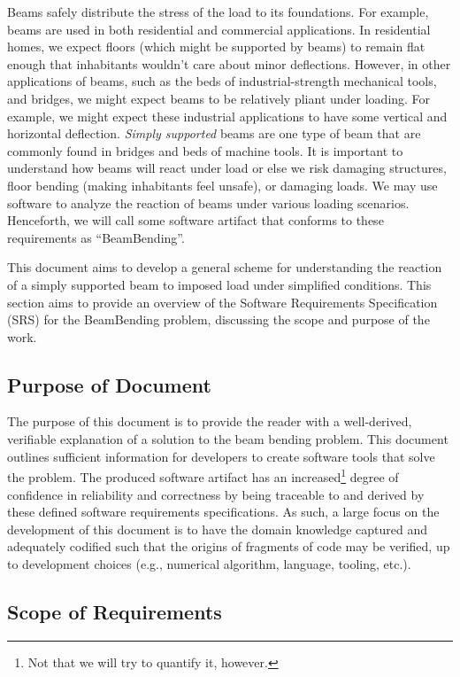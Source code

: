 \documentclass[12pt]{article}
\begin{document}
Beams safely distribute the stress of the load to its foundations. For example,
beams are used in both residential and commercial applications. In residential
homes, we expect floors (which might be supported by beams) to remain flat
enough that inhabitants wouldn't care about minor deflections. However, in other
applications of beams, such as the beds of industrial-strength mechanical tools,
and bridges, we might expect beams to be relatively pliant under loading. For
example, we might expect these industrial applications to have some vertical and
horizontal deflection. \textit{Simply supported} beams are one type of beam that
are commonly found in bridges and beds of machine tools. It is important to
understand how beams will react under load or else we risk damaging structures,
floor bending (making inhabitants feel unsafe), or damaging loads. We may use
software to analyze the reaction of beams under various loading scenarios.
Henceforth, we will call some software artifact that conforms to these
requirements as ``BeamBending''.

This document aims to develop a general scheme for understanding the reaction of
a simply supported beam to imposed load under simplified conditions. This
section aims to provide an overview of the Software Requirements Specification
(SRS) for the BeamBending problem, discussing the scope and purpose of the work.

\subsection{Purpose of Document}

The purpose of this document is to provide the reader with a well-derived,
verifiable explanation of a solution to the beam bending problem. This document
outlines sufficient information for developers to create software tools that
solve the \progname{} problem. The produced software artifact has an
increased\footnote{Not that we will try to quantify it, however.} degree of
confidence in reliability and correctness by being traceable to and derived by
these defined software requirements specifications. As such, a large focus on
the development of this document is to have the domain knowledge captured and
adequately codified such that the origins of fragments of code may be verified,
up to development choices (e.g., numerical algorithm, language, tooling, etc.).

\subsection{Scope of Requirements}
\label{ssec_scope}
\end{document}
